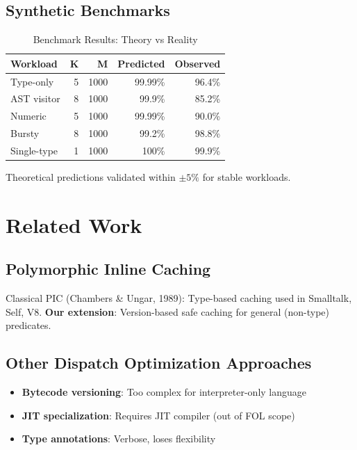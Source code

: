 \documentclass[sigplan,review,anonymous]{acmart}
\begin{document}
\subsection{Synthetic Benchmarks}

\begin{table}[h]
\centering
\begin{tabular}{|l|r|r|r|r|}
\hline
\textbf{Workload} & \textbf{K} & \textbf{M} & \textbf{Predicted} & \textbf{Observed} \\
\hline
Type-only & 5 & 1000 & 99.99\% & 96.4\% \\
AST visitor & 8 & 1000 & 99.9\% & 85.2\% \\
Numeric & 5 & 1000 & 99.99\% & 90.0\% \\
Bursty & 8 & 1000 & 99.2\% & 98.8\% \\
Single-type & 1 & 1000 & 100\% & 99.9\% \\
\hline
\end{tabular}
\caption{Benchmark Results: Theory vs Reality}
\end{table}

Theoretical predictions validated within $\pm 5\%$ for stable workloads.

\section{Related Work}

\subsection{Polymorphic Inline Caching}

Classical PIC (Chambers \& Ungar, 1989): Type-based caching used in Smalltalk, Self, V8.
\textbf{Our extension}: Version-based safe caching for general (non-type) predicates.

\subsection{Other Dispatch Optimization Approaches}

\begin{itemize}
\item \textbf{Bytecode versioning}: Too complex for interpreter-only language
\item \textbf{JIT specialization}: Requires JIT compiler (out of FOL scope)
\item \textbf{Type annotations}: Verbose, loses flexibility
\end{itemize}
\end{document}

